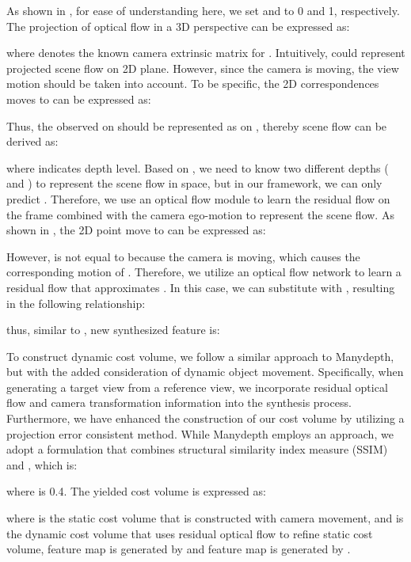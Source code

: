 \documentclass[journal]{IEEEtran}
\begin{document}
As shown in , for ease of understanding here, we set  and  to 0 and 1, respectively. The projection of optical flow in a 3D perspective can be expressed as:


where  denotes the known camera extrinsic matrix for . Intuitively,  could represent projected scene flow  on 2D plane. However, since the camera is moving, the view motion should be taken into account. To be specific, the 2D correspondences moves  to  can be expressed as:


Thus, the  observed on  should be represented as  on , thereby scene flow  can be derived as:

where  indicates  depth level. Based on , we need to know two different depths ( and ) to represent the scene flow  in space, but in our framework, we can only predict . Therefore, we use an optical flow module to learn the residual flow  on the frame  combined with the camera ego-motion to represent the scene flow. 
As shown in , the 2D point  move to  can be expressed as:



However,  is not equal to  because the camera is moving, which causes the corresponding motion of . Therefore, we utilize an optical flow network to learn a residual flow  that approximates . In this case, we can substitute  with , resulting in the following relationship:

thus, similar to , new synthesized feature  is:


To construct dynamic cost volume, we follow a similar approach to Manydepth, but with the added consideration of dynamic object movement. Specifically, when generating a target view from a reference view, we incorporate residual optical flow and camera transformation information into the synthesis process. Furthermore, we have enhanced the construction of our cost volume by utilizing a projection error consistent method. While Manydepth employs an  approach, we adopt a formulation that combines structural similarity index measure (SSIM) and , which is:

where  is 0.4. The yielded cost volume is expressed as:


where  is the static cost volume that is constructed with camera movement, and  is the dynamic cost volume that uses residual optical flow to refine static cost volume, feature map  is generated by  and feature map  is generated by .
\end{document}
